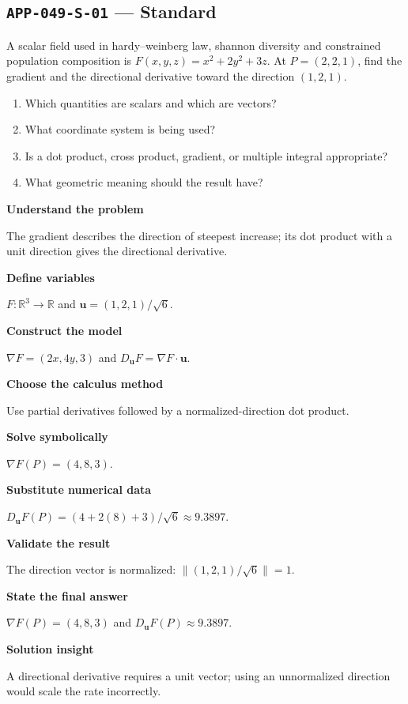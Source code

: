 \documentclass[11pt]{book}
\newcommand{\pid}[1]{\texttt{#1}}
\begin{document}
\subsection*{\pid{APP-049-S-01} — Standard}
\begin{problembox}
A scalar field used in hardy–weinberg law, shannon diversity and constrained population composition is $F(x,y,z)=x^2+2y^2+3z$. At $P=(2,2,1)$, find the gradient and the directional derivative toward the direction $(1,2,1)$.
\end{problembox}
\begin{promptbox}\begin{enumerate}
\item Which quantities are scalars and which are vectors?
\item What coordinate system is being used?
\item Is a dot product, cross product, gradient, or multiple integral appropriate?
\item What geometric meaning should the result have?
\end{enumerate}\end{promptbox}
\begin{solutionbox}
\textbf{Understand the problem}\par The gradient describes the direction of steepest increase; its dot product with a unit direction gives the directional derivative.\par\medskip
\textbf{Define variables}\par $F:\mathbb R^3\to\mathbb R$ and $\mathbf u=(1,2,1)/\sqrt6$.\par\medskip
\textbf{Construct the model}\par $\nabla F=(2x,4y,3)$ and $D_{\mathbf u}F=\nabla F\cdot\mathbf u$.\par\medskip
\textbf{Choose the calculus method}\par Use partial derivatives followed by a normalized-direction dot product.\par\medskip
\textbf{Solve symbolically}\par $\nabla F(P)=(4,8,3)$.\par\medskip
\textbf{Substitute numerical data}\par $D_{\mathbf u}F(P)=(4+2(8)+3)/\sqrt6\approx 9.3897$.\par\medskip
\textbf{Validate the result}\par The direction vector is normalized: $\|(1,2,1)/\sqrt6\|=1$.\par\medskip
\textbf{State the final answer}\par $\nabla F(P)=(4,8,3)$ and $D_{\mathbf u}F(P)\approx 9.3897$.\par\medskip
\textbf{Solution insight}\par A directional derivative requires a unit vector; using an unnormalized direction would scale the rate incorrectly.\par\medskip
\end{solutionbox}
\end{document}
